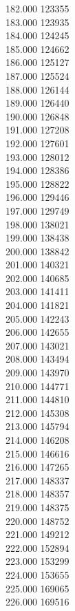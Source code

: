{ 182.000	123355 \\
 183.000	123935 \\
 184.000	124245 \\
 185.000	124662 \\
 186.000	125127 \\
 187.000	125524 \\
 188.000	126144 \\
 189.000	126440 \\
 190.000	126848 \\
 191.000	127208 \\
 192.000	127601 \\
 193.000	128012 \\
 194.000	128386 \\
 195.000	128822 \\
 196.000	129446 \\
 197.000	129749 \\
 198.000	138021 \\
 199.000	138438 \\
 200.000	138842 \\
 201.000	140321 \\
 202.000	140685 \\
 203.000	141411 \\
 204.000	141821 \\
 205.000	142243 \\
 206.000	142655 \\
 207.000	143021 \\
 208.000	143494 \\
 209.000	143970 \\
 210.000	144771 \\
 211.000	144810 \\
 212.000	145308 \\
 213.000	145794 \\
 214.000	146208 \\
 215.000	146616 \\
 216.000	147265 \\
 217.000	148337 \\
 218.000	148357 \\
 219.000	148375 \\
 220.000	148752 \\
 221.000	149212 \\
 222.000	152894 \\
 223.000	153299 \\
 224.000	153655 \\
 225.000	169065 \\
 226.000	169516 \\
}
